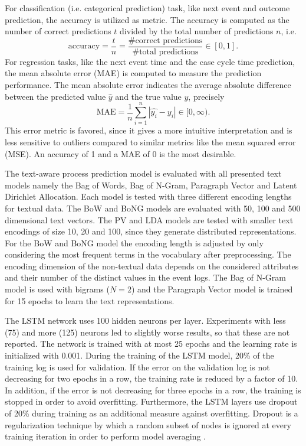 For classification (i.e. categorical prediction) task, like next event and outcome prediction, the accuracy is utilized as metric.
The accuracy is computed as the number of correct predictions $t$ divided by the total number of predictions $n$, i.e. 
\begin{equation*}
	\textrm{accuracy} = \dfrac{t}{n} = \dfrac{\textrm{\# correct predictions}}{\textrm{\# total predictions}} \in [0,1].
\end{equation*}
For regression tasks, like the next event time and the case cycle time prediction, the mean absolute error (MAE) is computed to measure the prediction performance. The mean absolute error indicates the average absolute difference between the predicted value $\hat{y}$ and the true value $y$,  precisely
\begin{equation*}
	\textrm{MAE} = \dfrac{1}{n}\sum_{i=1}^{n}|\hat{y_i} - y_i| \in [0, \infty).
\end{equation*}
This error metric is favored, since it gives a more intuitive interpretation and is less sensitive to outliers compared to similar metrics like the mean squared error (MSE).
An accuracy of 1 and a MAE of 0 is the most desirable.

The text-aware process prediction model is evaluated with all presented text models namely the Bag of Words, Bag of N-Gram, Paragraph Vector and Latent Dirichlet Allocation.
Each model is tested with three different encoding lengths for textual data.
The BoW and BoNG models are evaluated with 50, 100 and 500 dimensional text vectors. The PV and LDA models are tested with smaller text encodings of size 10, 20 and 100, since they generate distributed representations.
For the BoW and BoNG model the encoding length is adjusted by only considering the most frequent terms in the vocabulary after preprocessing.
The encoding dimension of the non-textual data depends on the considered attributes and their number of the distinct values in the event logs.
The Bag of N-Gram model is used with bigrams ($N = 2$) and the Paragraph Vector model is trained for 15 epochs to learn the text representations.

The LSTM network uses 100 hidden neurons per layer.
Experiments with less (75) and more (125) neurons led to slightly worse results, so that these are not reported.
The network is trained with at most 25 epochs and the learning rate is initialized with 0.001.
During the training of the LSTM model, 20\% of the training log is used for validation.
If the error on the validation log is not decreasing for two epochs in a row, the training rate is reduced by a factor of 10.
In addition, if the error is not decreasing for three epochs in a row, the training is stopped in order to avoid overfitting.
Furthermore, the LSTM layers use dropout of 20\% during training as an additional measure against overfitting.
Dropout is a regularization technique by which a random subset of nodes is ignored at every training iteration in order to perform model averaging \cite{DBLP:journals/corr/abs-1207-0580}.



